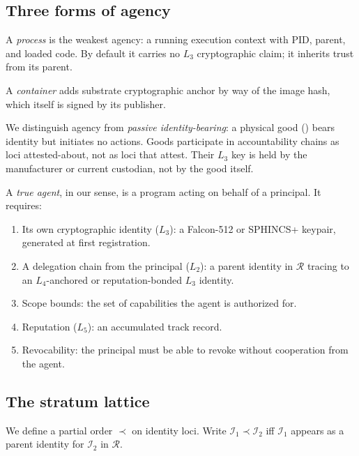\documentclass[11pt,a4paper,parskip=half-,DIV=12,headings=standardclasses]{scrartcl}
\theoremstyle{ncthm}
\theoremstyle{ncdef}
\newcommand{\identity}{\mathcal{I}}
\newcommand{\relations}{\mathcal{R}}
\begin{document}
\subsection{Three forms of agency}

A \emph{process} is the weakest agency: a running execution context
with PID, parent, and loaded code. By default it carries no $L_3$
cryptographic claim; it inherits trust from its parent.

A \emph{container} adds substrate cryptographic anchor by way of
the image hash, which itself is signed by its publisher.

\noindent We distinguish agency from \emph{passive identity-bearing}:
a physical good () bears identity but
initiates no actions. Goods participate in accountability chains as
loci attested-about, not as loci that attest. Their $L_3$ key is held
by the manufacturer or current custodian, not by the good itself.

A \emph{true agent}, in our sense, is a program acting on behalf of a
principal. It requires:
\begin{enumerate}
\item Its own cryptographic identity ($L_3$): a Falcon-512 or
  SPHINCS+ keypair, generated at first registration.
\item A delegation chain from the principal ($L_2$): a parent identity
  in $\relations$ tracing to an $L_4$-anchored or
  reputation-bonded $L_3$ identity.
\item Scope bounds: the set of capabilities the agent is authorized
  for.
\item Reputation ($L_5$): an accumulated track record.
\item Revocability: the principal must be able to revoke without
  cooperation from the agent.
\end{enumerate}

\subsection{The stratum lattice}

We define a partial order $\prec$ on identity loci. Write
$\identity_1 \prec \identity_2$ iff $\identity_1$ appears as a
parent identity for $\identity_2$ in $\relations$.
\end{document}
